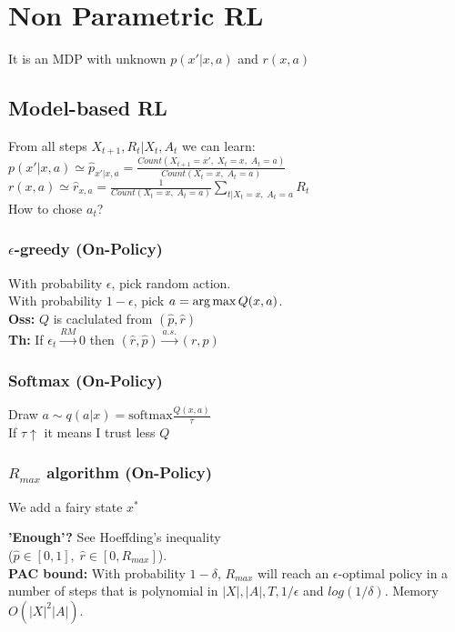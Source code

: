 \section{Non Parametric RL}
It is an MDP with unknown $p(x'\vert x,a)$ and $r(x,a)$

\subsection{Model-based RL}
From all steps $X_{t+1},R_t \vert X_{t}, A_{t}$ we can learn:\\
$p(x'\vert x,a)\simeq \hat{p}_{x'\vert x, a} = \frac{Count(X_{t+1}=x',\; X_t=x,\;A_t =a)}{Count(X_t=x,\; A_t = a)}$\\
$r(x,a)\simeq \hat{r}_{x,a}= \frac{1}{Count(X_t=x,\; A_t=a)}\sum_{t|X_t=x,\; A_t=a}R_t$\\
How to chose $a_t$?

\subsubsection{$\epsilon$-greedy (On-Policy)}
With probability $\epsilon$, pick random action.\\
With probability $1-\epsilon$, pick $a = \operatorname*{arg\,max} Q(x,a)$.\\
\textbf{Oss:} $Q$ is caclulated from $(\hat{p}, \hat{r})$\\
\textbf{Th:} If $\epsilon_t\xrightarrow{RM}0$ then $(\hat{r},\hat{p})\xrightarrow{a.s.}(r,p)$

\subsubsection{Softmax (On-Policy)}
Draw $a \sim q(a\vert x) = \text{softmax}\frac{Q(x,a)}{\tau}$\\
If $\tau \uparrow $ it means I trust less $Q$

\subsubsection{$R_{max}$ algorithm (On-Policy)}
We add a fairy state $x^*$\\
\begin{algorithm}[H]
\end{algorithm}
\textbf{'Enough'?} See Hoeffding's inequality \\
($\hat{p}\in [0, 1],\; \hat{r}\in [0, R_{max}]$).\\
\textbf{PAC bound:} With probability $1-\delta$, $R_{max}$ will reach an $\epsilon$-optimal policy in a number of steps that is polynomial in $|X|, |A|, T, 1/\epsilon$ and $log(1/\delta)$. Memory $O(|X|^2|A|)$. 

